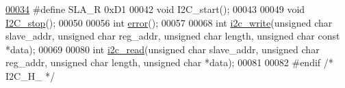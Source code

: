 \begin{DoxyCode}
\hypertarget{_i2_c_8h_source.tex_l00034}{}\hyperlink{_i2_c_8h_ae4af1f304be9d3202a445e7d6c235eaa}{00034} \textcolor{preprocessor}{#define SLA\_R 0xD1                      }
00042 \textcolor{preprocessor}{void I2C\_start();}
00043 
00049 \textcolor{keywordtype}{void} \hyperlink{_i2_c_8h_af8dcc1bcb3e1c6c0fcdca4cf599a239b}{I2C\_stop}();
00050 
00056 \textcolor{keywordtype}{int} \hyperlink{_i2_c_8h_ad1a5ba420409525ff5ab1be86ac5e526}{error}();
00057 
00068 \textcolor{keywordtype}{int} \hyperlink{_i2_c_8h_ac0f145afe8d662af199043939f4398d6}{i2c\_write}(\textcolor{keywordtype}{unsigned} \textcolor{keywordtype}{char} slave\_addr, \textcolor{keywordtype}{unsigned} \textcolor{keywordtype}{char} reg\_addr, \textcolor{keywordtype}{unsigned} \textcolor{keywordtype}{char} length, \textcolor{keywordtype}{unsigned} \textcolor{keywordtype}{
      char} \textcolor{keyword}{const} *data);
00069 
00080 \textcolor{keywordtype}{int} \hyperlink{_i2_c_8h_ac2d47e7a6c76f93f9b537c31a2986e7b}{i2c\_read}(\textcolor{keywordtype}{unsigned} \textcolor{keywordtype}{char} slave\_addr, \textcolor{keywordtype}{unsigned} \textcolor{keywordtype}{char} reg\_addr, \textcolor{keywordtype}{unsigned} \textcolor{keywordtype}{char} length, \textcolor{keywordtype}{unsigned} \textcolor{keywordtype}{char} 
      *data);
00081 
00082 \textcolor{preprocessor}{#endif }\textcolor{comment}{/* I2C\_H\_ */}\textcolor{preprocessor}{}
\end{DoxyCode}
